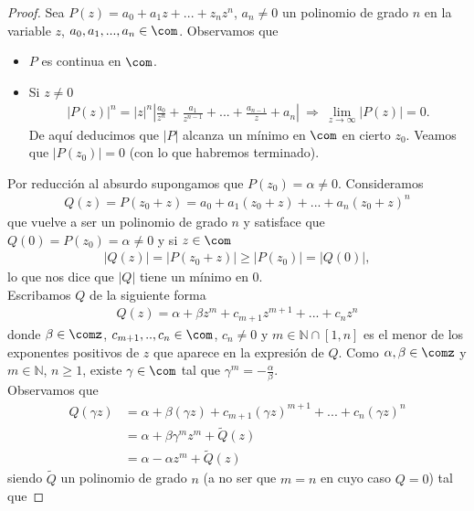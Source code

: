 \begin{proof}
Sea $P(z) = a_0 + a_1z + ... + z_nz^n$, $a_n \not = 0$ un polinomio de grado $n$ en la variable $z$, $a_0, a_1,...,a_n \in \com$. Observamos que
\begin{itemize}
    \item $P$ es continua en $\com$.
    \item Si $z \not = 0$
    \begin{align*}
        |P(z)|^n = |z|^n \left| \frac{a_0}{z^n} + \frac{a_1}{z^{n-1}} + ... + \frac{a_{n-1}}{z} + a_n\right| \ \Longrightarrow \ \lim_{z \to \infty}{|P(z)| = 0}.
    \end{align*}
    De aquí deducimos que $|P|$ alcanza un mínimo en $\com$ en cierto $z_0$. Veamos que $|P(z_0)| = 0$ (con lo que habremos terminado).
\end{itemize}
Por reducción al absurdo supongamos que $P(z_0) = \alpha \not = 0$. Consideramos
\begin{align*}
    Q(z) = P(z_0 + z) = a_0 + a_1(z_0 + z) + ... + a_n(z_0 + z)^n
\end{align*}
que vuelve a ser un polinomio de grado $n$ y satisface que $Q(0) = P(z_0) = \alpha \not = 0$ y si $z \in \com$
\begin{align*}
    |Q(z)| = |P(z_0 + z)| \ge |P(z_0)| = |Q(0)|,
\end{align*}
lo que nos dice que $|Q|$ tiene un mínimo en 0.
\\
\newline
Escribamos $Q$ de la siguiente forma
\begin{align*}
    Q(z) = \alpha + \beta z^m + c_{m+1}z^{m+1} + ... + c_n z^n
\end{align*}
donde $\beta \in \comz$, $c_{m+1},..,c_n \in \com$, $c_n \not = 0$ y $m \in \mathbb{N} \cap [1,n]$ es el menor de los exponentes positivos de $z$ que aparece en la expresión de $Q$. Como $\alpha, \beta \in \comz$ y $m \in \mathbb{N}$, $n \ge 1$, existe $\gamma \in \com$ tal que $\gamma^m = -\frac{\alpha}{\beta}$.
\\
\newline
Observamos que
\begin{align*}
    Q(\gamma z) &= \alpha + \beta(\gamma z) + c_{m+1}(\gamma z)^{m+1} + ... + c_n (\gamma z)^n \\
    &= \alpha + \beta \gamma^m z^m + \widetilde{Q}(z) \\
    &= \alpha - \alpha z^m + \widetilde{Q}(z)
\end{align*}
siendo $\widetilde{Q}$ un polinomio de grado $n$ (a no ser que $m = n$ en cuyo caso $Q = 0$) tal que

\end{proof}
